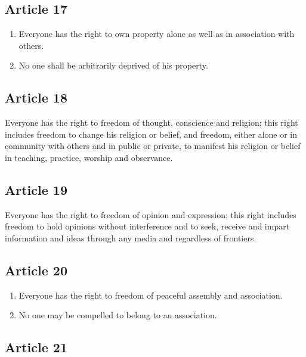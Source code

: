 \documentclass[
  ngerman,
  american,
  titlepage,
  openright,
  DIV=calc,
  toc=listof,
  listof=nochaptergap]{scrbook}
\begin{document}
\subsection{Article 17}\label{article-17-1}

\begin{enumerate}
\def\labelenumi{\arabic{enumi}.}
\item
  Everyone has the right to own property alone as well as in association
  with others.
\item
  No one shall be arbitrarily deprived of his property.
\end{enumerate}

\subsection{Article 18}\label{article-18-1}

Everyone has the right to freedom of thought, conscience and religion;
this right includes freedom to change his religion or belief, and
freedom, either alone or in community with others and in public or
private, to manifest his religion or belief in teaching, practice,
worship and observance.

\subsection{Article 19}\label{article-19-1}

Everyone has the right to freedom of opinion and expression; this right
includes freedom to hold opinions without interference and to seek,
receive and impart information and ideas through any media and
regardless of frontiers.

\subsection{Article 20}\label{article-20-1}

\begin{enumerate}
\def\labelenumi{\arabic{enumi}.}
\item
  Everyone has the right to freedom of peaceful assembly and
  association.
\item
  No one may be compelled to belong to an association.
\end{enumerate}

\subsection{Article 21}\label{article-21-1}
\end{document}
